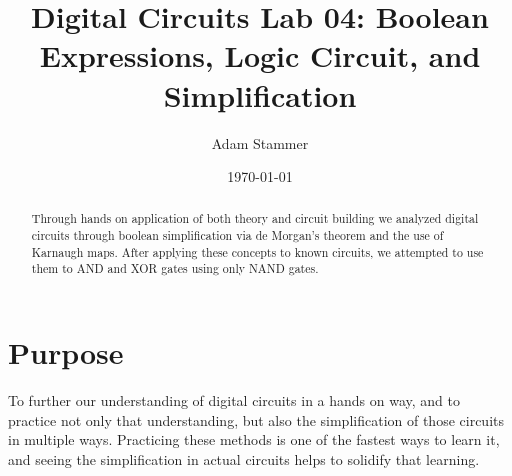 \documentclass[prb,preprint]{revtex4-1}
\begin{document}
\title{Digital Circuits Lab 04: Boolean Expressions, Logic Circuit, and Simplification}
\author{Adam Stammer}

\date{\today}

\begin{abstract}
Through hands on application of both theory and circuit building we analyzed digital circuits through boolean simplification via de Morgan's theorem and the use of Karnaugh maps. After applying these concepts to known circuits, we attempted to use them to AND and XOR gates using only NAND gates.
\end{abstract}

\maketitle


%
%
%
%
%
%
%
%

\section{Purpose}
To further our understanding of digital circuits in a hands on way, and to practice not only that understanding, but also the simplification of those circuits in multiple ways. Practicing these methods is one of the fastest ways to learn it, and seeing the simplification in actual circuits helps to solidify that learning.
\end{document}
